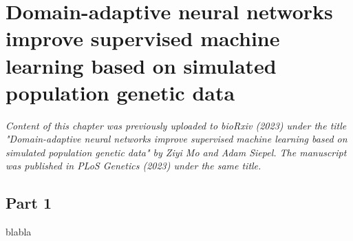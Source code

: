 \chapter{Domain-adaptive neural networks improve supervised machine learning based on simulated population genetic data}

\textit{Content of this chapter was previously uploaded to bioRxiv (2023) under the title "Domain-adaptive neural networks improve supervised machine learning based on simulated population genetic data" by Ziyi Mo and Adam Siepel. The manuscript was published in PLoS Genetics (2023) under the same title.}

\section{Part 1}
blabla